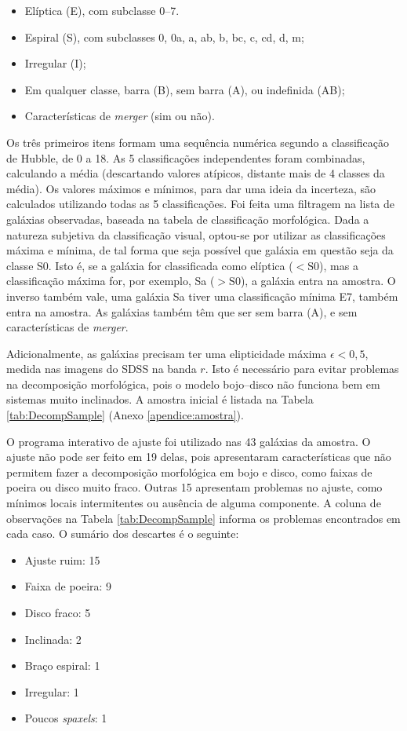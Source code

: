\begin{itemize}
  \item Elíptica (E), com subclasse 0--7.
  \item Espiral (S), com subclasses 0, 0a, a, ab, b, bc, c, cd, d, m;
  \item Irregular (I);
  \item Em qualquer classe, barra (B), sem barra (A), ou indefinida (AB);
  \item Características de {\em merger} (sim ou não).
\end{itemize}

Os três primeiros itens formam uma sequência numérica segundo a classificação de
Hubble, de 0 a 18. As 5 classificações independentes foram combinadas,
calculando a média (descartando valores atípicos, distante mais de 4 classes da
média). Os valores máximos e mínimos, para dar uma ideia da incerteza, são
calculados utilizando todas as 5 classificações. Foi feita uma filtragem na
lista de galáxias observadas, baseada na tabela de classificação morfológica.
Dada a natureza subjetiva da classificação visual, optou-se por utilizar as
classificações máxima e mínima, de tal forma que seja possível que galáxia em
questão seja da classe S0. Isto é, se a galáxia for classificada como elíptica
($<\mathrm{S0}$), mas a classificação máxima for, por exemplo, Sa
($>\mathrm{S0}$), a galáxia entra na amostra. O inverso também vale, uma galáxia
Sa tiver uma classificação mínima E7, também entra na amostra.
As galáxias também têm que ser sem barra (A), e sem características de {\em
merger}.

Adicionalmente, as galáxias precisam ter uma elipticidade máxima $\epsilon<0,5$,
medida nas imagens do SDSS na banda $r$. Isto é necessário para evitar problemas
na decomposição morfológica, pois o modelo bojo--disco não funciona bem em
sistemas muito inclinados. A amostra inicial é listada na Tabela
\ref{tab:DecompSample} (Anexo \ref{apendice:amostra}).

O programa interativo de ajuste foi utilizado nas 43 galáxias da amostra.
O ajuste não pode ser feito em 19 delas, pois apresentaram características que
não permitem fazer a decomposição morfológica em bojo e disco, como faixas de
poeira ou disco muito fraco. Outras 15 apresentam problemas no ajuste, como
mínimos locais intermitentes ou ausência de alguma componente. A coluna de
observações na Tabela \ref{tab:DecompSample} informa os problemas encontrados em
cada caso. O sumário dos descartes é o seguinte:

\begin{itemize}
  \item Ajuste ruim: 15
  \item Faixa de poeira: 9
  \item Disco fraco: 5
  \item Inclinada: 2
  \item Braço espiral: 1
  \item Irregular: 1
  \item Poucos {\em spaxels}: 1
\end{itemize}

